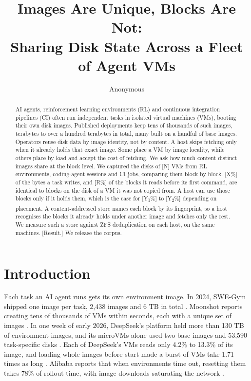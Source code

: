 \documentclass[10pt,twocolumn]{article}
\title{Images Are Unique, Blocks Are Not:\\Sharing Disk State Across a Fleet of Agent VMs}
\author{Anonymous}
\date{}
\begin{document}
\maketitle
\begin{abstract}
AI agents, reinforcement learning environments (RL) and continuous integration pipelines (CI) often run independent tasks in isolated virtual machines (VMs), booting their own disk images. Published deployments keep tens of thousands of such images, terabytes to over a hundred terabytes in total, many built on a handful of base images. Operators reuse disk data by image identity, not by content. A host skips fetching only when it already holds that exact image. Some place a VM by image locality, while others place by load and accept the cost of fetching. We ask how much content distinct images share at the block level. We captured the disks of [N] VMs from RL environments, coding-agent sessions and CI jobs, comparing them block by block. [X\%] of the bytes a task writes, and [R\%] of the blocks it reads before its first command, are identical to blocks on the disk of a VM it was not copied from. A host can use those blocks only if it holds them, which is the case for [Y\textsubscript{1}\%] to [Y\textsubscript{2}\%] depending on placement. A content-addressed store names each block by its fingerprint, so a host recognises the blocks it already holds under another image and fetches only the rest. We measure such a store against ZFS deduplication on each host, on the same machines. [Result.] We release the corpus.
\end{abstract}

\section{Introduction}

Each task an AI agent runs gets its own environment image. In 2024, SWE-Gym shipped one image per task, 2,438 images and 6 TB in total \cite{swe-gym}. Moonshot reports creating tens of thousands of VMs within seconds, each with a unique set of images \cite{kimi-k3}. In one week of early 2026, DeepSeek's platform held more than 130 TB of environment images, and its microVMs alone used two base images and 53,590 task-specific disks \cite{dsec}. Each of DeepSeek's VMs reads only 4.2\% to 13.3\% of its image, and loading whole images before start made a burst of VMs take 1.71 times as long \cite{dsec}. Alibaba reports that when environments time out, resetting them takes 78\% of rollout time, with image downloads saturating the network \cite{rollart}.
\end{document}
